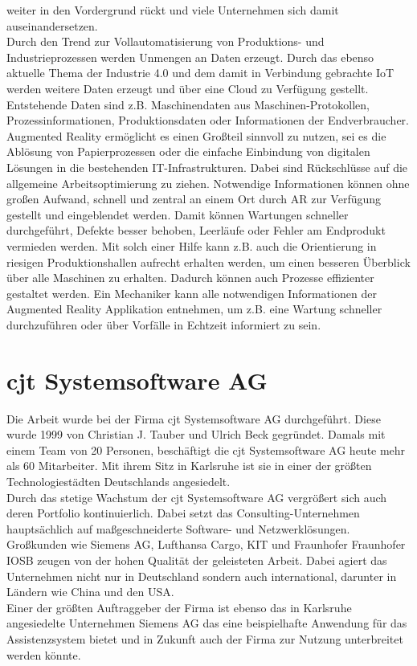 weiter in den Vordergrund rückt und viele Unternehmen sich damit auseinandersetzen.
\\ 
\linebreak
Durch den Trend zur Vollautomatisierung von Produktions- und Industrieprozessen werden Unmengen an Daten erzeugt. Durch das ebenso 
aktuelle Thema der Industrie 4.0 und dem damit in Verbindung gebrachte \acs{IoT} werden weitere Daten erzeugt und über eine Cloud zu 
Verfügung gestellt. Entstehende Daten sind z.B. Maschinendaten aus Maschinen-Protokollen, Prozessinformationen, Produktionsdaten oder 
Informationen der Endverbraucher. \cite{industrie40.2019f} Augmented Reality ermöglicht es einen Großteil sinnvoll zu nutzen, sei es 
die Ablösung von Papierprozessen oder die einfache Einbindung von digitalen Lösungen in die bestehenden IT-Infrastrukturen. \cite{industrie40ar.2019n} 
Dabei sind Rückschlüsse auf die allgemeine Arbeitsoptimierung zu ziehen. Notwendige Informationen können ohne 
großen Aufwand, schnell und zentral an einem Ort durch AR zur Verfügung gestellt und eingeblendet werden. Damit können 
Wartungen schneller durchgeführt, Defekte besser behoben, Leerläufe oder Fehler am Endprodukt vermieden werden. Mit solch einer Hilfe 
kann z.B. auch die Orientierung in riesigen Produktionshallen aufrecht erhalten werden, um einen besseren Überblick über alle Maschinen 
zu erhalten. Dadurch können auch Prozesse effizienter gestaltet werden. Ein Mechaniker kann alle notwendigen Informationen der Augmented 
Reality Applikation entnehmen, um z.B. eine Wartung schneller durchzuführen oder über Vorfälle in Echtzeit informiert zu sein. 

\section{cjt Systemsoftware AG}
\label{chap:cjt}
Die Arbeit wurde bei der Firma cjt Systemsoftware AG durchgeführt. Diese wurde
1999 von Christian J. Tauber und Ulrich Beck gegründet. Damals mit einem Team
von 20 Personen, beschäftigt die cjt Systemsoftware AG heute mehr als 60 Mitarbeiter. 
Mit ihrem Sitz in Karlsruhe ist sie in einer der größten Technologiestädten Deutschlands angesiedelt.
\\
\linebreak
Durch das stetige Wachstum der cjt Systemsoftware AG vergrößert sich auch deren
Portfolio kontinuierlich. Dabei setzt das Consulting-Unternehmen hauptsächlich auf maßgeschneiderte
Software- und Netzwerklösungen. Großkunden wie Siemens AG, Lufthansa Cargo,
\acs{KIT} und Fraunhofer \acs{Fraunhofer IOSB} zeugen von der hohen Qualität der geleisteten Arbeit. 
Dabei agiert das Unternehmen nicht nur in Deutschland sondern auch international, darunter in Ländern wie China und den USA.
\\ 
\linebreak
Einer der größten Auftraggeber der Firma ist ebenso das in Karlsruhe angesiedelte Unternehmen Siemens AG das eine beispielhafte 
Anwendung für das Assistenzsystem bietet und in Zukunft auch der Firma zur Nutzung unterbreitet werden könnte. 
\pagebreak

